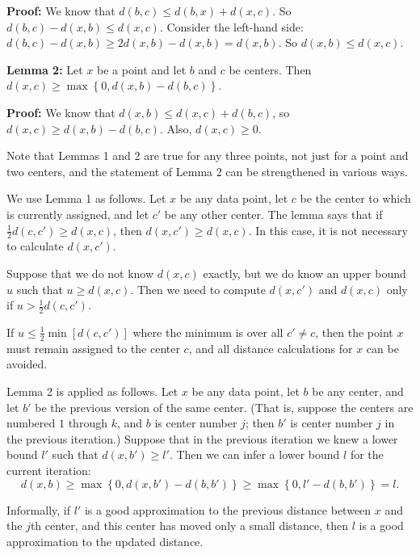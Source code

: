 \textbf{Proof:} We know that \( d(b, c) \le d(b, x) + d(x, c) \). So \( d(b, c) - d(x, b) \le d(x, c) \). Consider the left-hand side: \( d(b, c) - d(x, b) \ge 2d(x, b) - d(x, b) = d(x, b) \). So \( d(x, b) \le d(x, c) \).

\textbf{Lemma 2:} Let \( x \) be a point and let \( b \) and \( c \) be centers. Then  \( d(x, c) \ge \max\left\{0, d(x, b) - d(b, c)\right\} \).

\textbf{Proof:} We know that \( d(x, b) \le d(x, c) + d(b, c) \), so \( d(x, c) \ge d(x, b) - d(b, c) \). Also, \( d(x, c) \ge 0 \).

Note that Lemmas 1 and 2 are true for any three points, not just for a point and two centers, and the statement of Lemma 2 can be strengthened in various ways.

We use Lemma 1 as follows. Let \( x \) be any data point, let \( c \) be the center to which is currently assigned, and let \( c' \) be any other center. The lemma says that if \( \frac{1}{2} d(c, c') \ge d(x, c) \), then \( d(x, c') \ge d(x, c) \). In this case, it is not necessary to calculate \( d(x, c') \).

Suppose that we do not know \( d(x, c) \) exactly, but we do know an upper bound \( u \) such that \( u \ge d(x, c) \). Then we need to compute \( d(x, c') \) and \( d(x, c) \) only if \( u > \frac{1}{2} d(c, c') \).

If \( u \le \frac{1}{2} \min\left[d(c, c')\right] \) where the minimum is over all \( c' \ne c \), then the point \( x \) must remain assigned to the center \( c \), and all distance calculations for \( x \) can be avoided.

Lemma 2 is applied as follows. Let \( x \) be any data point, let \( b \) be any center, and let \( b' \) be the previous version of the same center. (That is, suppose the centers are numbered \( 1 \) through \( k \), and \( b \) is center number \( j \); then  \( b' \) is center number \( j \) in the previous iteration.) Suppose that in the previous iteration we knew a lower bound \( l' \) such that \( d(x, b') \ge l' \). Then we can infer a lower bound \( l \) for the current iteration:
\[
  d(x, b) \ge \max\left\{0, d(x, b') - d(b, b')\right\} \ge \max\left\{0, l' - d(b, b')\right\} = l.
\]

Informally, if \( l' \) is a good approximation to the previous distance between \( x \) and the \( j \)th center, and this center has moved only a small distance, then \( l \) is a good approximation to the updated distance.

